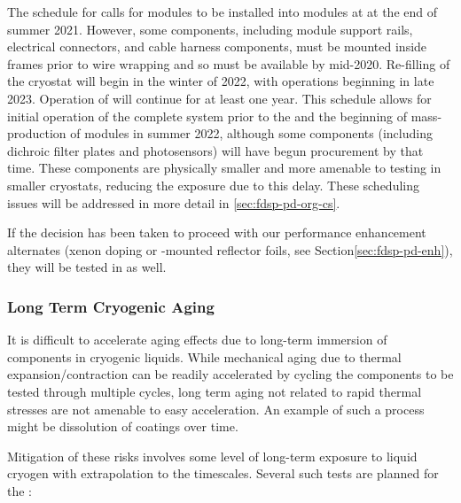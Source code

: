 The schedule for  calls for  modules to be installed into  modules at  at the end of summer 2021. However, some components, including module support rails, electrical connectors, and cable harness components, must be mounted inside  frames prior to wire wrapping and so must be available by mid-2020. 
Re-filling of the  cryostat will begin in the winter of 2022, with operations beginning in late 2023.  Operation of  will continue for at least one year.  This schedule allows for initial operation of the complete system prior to the   and the beginning of mass-production of  modules in summer 2022, although some components (including dichroic filter plates and photosensors) will have begun procurement by that time.  These components are physically smaller and more amenable to testing in smaller cryostats, reducing the exposure due to this delay.  These scheduling issues will be addressed in more detail in \ref{sec:fdsp-pd-org-cs}.

If the decision has been taken to proceed with our performance enhancement alternates (xenon doping or -mounted reflector foils, see Section\ref{sec:fdsp-pd-enh}), they will be tested in  as well.

\subsubsection{Long Term Cryogenic Aging}
\label{sec:valid-longtermaging}

It is difficult to accelerate aging effects due to long-term immersion of components in cryogenic liquids.  While mechanical aging due to thermal expansion/contraction can be readily accelerated by cycling the components to be tested through multiple cycles, long term aging not related to rapid thermal stresses are not amenable to easy acceleration.  An example of such a process might be dissolution of  coatings over time.

Mitigation of these risks involves some level of long-term exposure to liquid cryogen with extrapolation to the  timescales.  Several such tests are planned for the :



